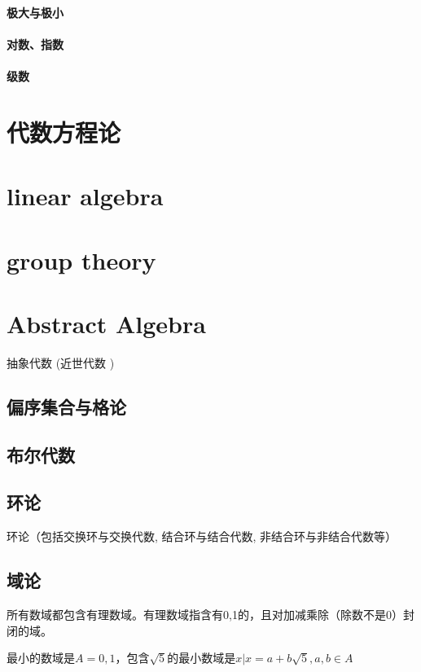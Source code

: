 \documentclass[UTF8]{../09-Mathematics}
\begin{document}
\subsubsection{极大与极小}
\subsubsection{对数、指数}
\subsubsection{级数}



\chapter{代数方程论}

\chapter{linear algebra}


\chapter{group theory}




\chapter{Abstract Algebra}
抽象代数 (近世代数 )

\section{偏序集合与格论}
\section{布尔代数}
\section{环论}
环论（包括交换环与交换代数, 结合环与结合代数, 非结合环与非结合代数等）
\section{域论}

所有数域都包含有理数域。有理数域指含有0,1的，且对加减乘除（除数不是0）封闭的域。

最小的数域是$A = {0,1}$，包含$\sqrt{5}$的最小数域是$ x| x = a + b\sqrt{5}, a , b \in A$
\end{document}
